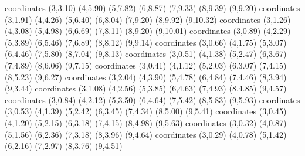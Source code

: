 coordinates {(3,3.10) (4,5.90) (5,7.82) (6,8.87) (7,9.33) (8,9.39) (9,9.20)}
coordinates {(3,1.91) (4,4.26) (5,6.40) (6,8.04) (7,9.20) (8,9.92) (9,10.32)}
coordinates {(3,1.26) (4,3.08) (5,4.98) (6,6.69) (7,8.11) (8,9.20) (9,10.01)}
coordinates {(3,0.89) (4,2.29) (5,3.89) (6,5.46) (7,6.89) (8,8.12) (9,9.14)}
coordinates {(3,0.66) (4,1.75) (5,3.07) (6,4.46) (7,5.80) (8,7.04) (9,8.13)}
coordinates {(3,0.51) (4,1.38) (5,2.47) (6,3.67) (7,4.89) (8,6.06) (9,7.15)}
coordinates {(3,0.41) (4,1.12) (5,2.03) (6,3.07) (7,4.15) (8,5.23) (9,6.27)}
coordinates {(3,2.04) (4,3.90) (5,4.78) (6,4.84) (7,4.46) (8,3.94) (9,3.44)}
coordinates {(3,1.08) (4,2.56) (5,3.85) (6,4.63) (7,4.93) (8,4.85) (9,4.57)}
coordinates {(3,0.84) (4,2.12) (5,3.50) (6,4.64) (7,5.42) (8,5.83) (9,5.93)}
coordinates {(3,0.53) (4,1.39) (5,2.42) (6,3.45) (7,4.34) (8,5.00) (9,5.41)}
coordinates {(3,0.45) (4,1.20) (5,2.15) (6,3.18) (7,4.15) (8,4.98) (9,5.63)}
coordinates {(3,0.32) (4,0.87) (5,1.56) (6,2.36) (7,3.18) (8,3.96) (9,4.64)}
coordinates {(3,0.29) (4,0.78) (5,1.42) (6,2.16) (7,2.97) (8,3.76) (9,4.51)}
